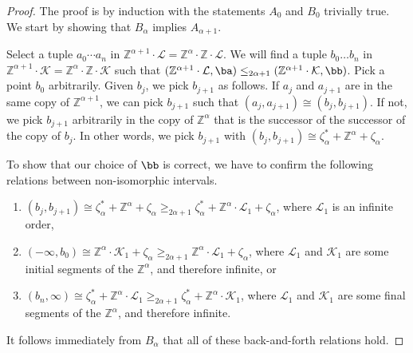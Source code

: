\documentclass{amsart}
\newcommand{\Z}{\mathbb{Z}}
\newcommand{\K}{\mathcal{K}}
\renewcommand{\L}{\mathcal{L}}
\begin{document}
\begin{proof}
    The proof is by induction with the statements $A_0$ and $B_0$ trivially true.
    We start by showing that $B_\alpha$ implies $A_{\alpha+1}$. 

    Select a tuple $a_0\cdots a_n$ in $\Z^{\alpha+1}\cdot \L=\Z^\alpha\cdot\Z\cdot
    \L$. We will find a tuple $b_0\dots b_n$ in $\Z^{\alpha+1}\cdot
    \K=\Z^\alpha\cdot\Z\cdot \K$ such that $(\Z^{\alpha+1}\cdot \L,\ba
    )\leq_{2\alpha+1} (\Z^{\alpha+1}\cdot \K,\bb)$. Pick a point $b_0$ arbitrarily.
    Given $b_j$, we pick $b_{j+1}$ as follows. If $a_j$ and $a_{j+1}$ are in the
    same copy of $\Z^{\alpha+1}$, we can pick $b_{j+1}$ such that
    $(a_j,a_{j+1})\cong(b_j,b_{j+1})$. If not, we pick $b_{j+1}$
    arbitrarily in the copy of $\Z^{\alpha}$ that is the successor of the successor
    of the copy of $b_j$. In other words, we pick $b_{j+1}$ with  $(b_j,b_{j+1})\cong \zeta^*_\alpha +\Z^\alpha+\zeta_\alpha$.
    
To show that our choice of $\bb$ is correct, we have to confirm the following
relations between non-isomorphic intervals.
\begin{enumerate}\tightlist
\item $(b_j,b_{j+1})\cong \zeta^*_\alpha +\Z^\alpha+\zeta_\alpha \geq_{2\alpha+1} \zeta^*_\alpha
    +\Z^\alpha\cdot \L_1+\zeta_\alpha$, where $\L_1$ is an infinite order,
\item $(-\infty,b_0)\cong \Z^\alpha\cdot \K_1+\zeta_\alpha \geq_{2\alpha+1}\Z^\alpha\cdot
    \L_1+\zeta_\alpha$, where $\L_1$ and $\K_1$ are some initial segments of the $\Z^\alpha$, and therefore infinite, or
\item $(b_{n},\infty)\cong\zeta^*_\alpha +\Z^\alpha\cdot \L_1 \geq_{2\alpha+1} \zeta^*_\alpha
    +\Z^\alpha\cdot \K_1$, where $\L_1$ and $\K_1$ are some final segments of the $\Z^\alpha$, and therefore infinite.
\end{enumerate} 
It follows immediately from $B_\alpha$ that all of these back-and-forth relations hold.


\end{proof}
\end{document}

